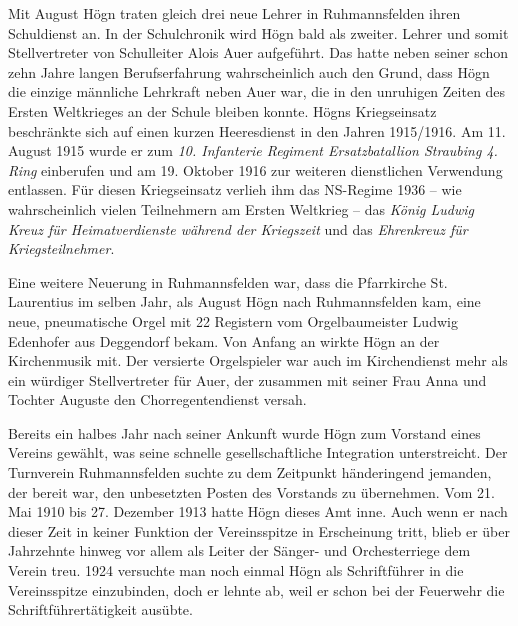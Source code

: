 \documentclass{book}
\begin{document}

Mit August Högn traten gleich drei neue Lehrer in Ruhmannsfelden ihren
Schuldienst an. In der Schulchronik wird Högn bald als zweiter. Lehrer
und somit Stellvertreter von Schulleiter Alois Auer aufgeführt. Das
hatte neben seiner schon zehn Jahre langen Berufserfahrung
wahrscheinlich auch den Grund, dass Högn die einzige männliche
Lehrkraft neben Auer war, die in den unruhigen Zeiten des Ersten
Weltkrieges an der Schule bleiben konnte. Högns Kriegseinsatz
beschränkte sich auf einen kurzen Heeresdienst in den Jahren 1915/1916.
Am 11. August 1915 wurde er zum \textit{10. Infanterie Regiment
Ersatzba\-tallion Straubing 4. Ring} einberufen und am 19. Oktober 1916
zur weiteren dienstlichen Verwendung entlassen. Für diesen
Kriegseinsatz verlieh ihm das NS-Regime 1936 – wie wahrscheinlich
vielen Teilnehmern am Ersten Welt\-krieg – das \textit{König Ludwig
Kreuz für Heimatverdienste während der Kriegszeit} und das
\textit{Ehrenkreuz für Kriegsteilnehmer}.

Eine weitere Neuerung in Ruhmannsfelden war, dass die Pfarrkirche St.
Laurentius im selben Jahr, als August Högn nach Ruhmannsfelden kam,
eine neue, pneumatische Orgel mit 22 Registern vom Orgelbaumeister
Ludwig Edenhofer aus Deggendorf bekam. Von Anfang an wirkte Högn an der
Kir\-chenmusik mit. Der versierte Orgelspieler war auch im
Kirchendienst mehr als ein würdiger Stellvertreter für Auer, der
zusammen mit seiner Frau Anna und Tochter Auguste den
Chorregentendienst versah.

Bereits ein halbes Jahr nach seiner Ankunft wurde Högn zum Vorstand
eines Vereins gewählt, was seine schnelle gesellschaftliche Integration
unter\-streicht. Der Turnverein Ruhmannsfelden suchte zu dem Zeitpunkt
händerin\-gend jemanden, der bereit war, den unbesetzten Posten des
Vorstands zu übernehmen. Vom 21. Mai 1910 bis 27. Dezember 1913 hatte
Högn dieses Amt inne. Auch wenn er nach dieser Zeit in keiner Funktion
der Vereinsspitze in Erscheinung tritt, blieb er über Jahrzehnte hinweg
vor allem als Leiter der Sänger- und Orchesterriege dem Verein treu.
1924 versuchte man noch ein\-mal Högn als Schriftführer in die
Vereinsspitze einzubinden, doch er lehnte ab, weil er schon bei der
Feuerwehr die Schriftführertätigkeit ausübte.
\end{document}
